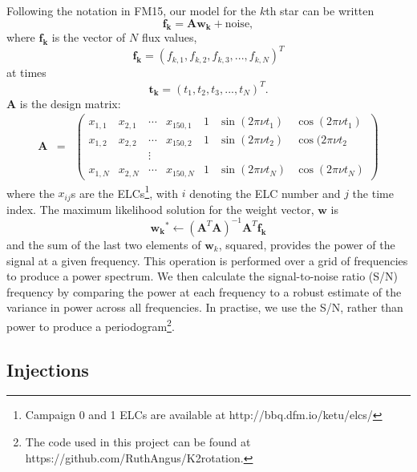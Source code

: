 \documentclass[useAMS, usenatbib]{aastex}
\begin{document}
Following the notation in FM15, our model for the $k$th star can be written
\begin{equation}
	\mathbf{f_k} = \mathbf{A}\mathbf{w_k} + \mathrm{noise},
\end{equation}
where $\mathbf{f_k}$ is the vector of $N$ flux values,
\begin{equation}
	\mathbf{f_k} = (f_{k,1}, f_{k,2}, f_{k,3}, ..., f_{k,N})^T
\end{equation}
at times
\begin{equation}
	\mathbf{t_k} = (t_1, t_2, t_3, ..., t_N)^T.
\end{equation}
$\mathbf{A}$ is the design matrix:
\begin{eqnarray}
	\mathbf{A} &=& \left (\begin{array}{ccccccc}
	x_{1,1} & x_{2,1} & \cdots & x_{150,1} & 1 & \sin(2\pi\nu t_1) & \cos(2\pi\nu t_1) \\
	x_{1,2} & x_{2,2} & \cdots & x_{150,2} & 1 & \sin(2\pi\nu t_2) & \cos(2\pi\nu t_2\\
    && \vdots &&&\\
	x_{1,N} & x_{2,N} & \cdots & x_{150,N} & 1 & \sin(2\pi\nu t_N) & \cos(2\pi\nu t_N)
\end{array}\right )
\end{eqnarray}
where the $x_{ij}$s are the ELCs\footnote{Campaign 0 and 1 ELCs are
available at http://bbq.dfm.io/ketu/elcs/}, with $i$ denoting the ELC number
and $j$ the time index. The maximum likelihood solution for the weight vector,
$\mathbf{w}$ is
\begin{equation}
	\mathbf{w_k}^* \gets (\mathbf{A}^T\mathbf{A})^{-1}\mathbf{A}^T\mathbf{f_k} \end{equation}
and the sum of the last two elements of $\mathbf{w}_k$, squared, provides the
power of the signal at a given frequency.
This operation is performed over a grid of frequencies to produce a power
spectrum.
We then calculate the signal-to-noise ratio (S/N) frequency by comparing the
power at each frequency to a robust estimate of the variance in power across
all frequencies.
In practise, we use the S/N, rather than power to produce a
periodogram\footnote{The code used in this project can be found at
https://github.com/RuthAngus/K2rotation.}.

\subsection{Injections}
\end{document}
